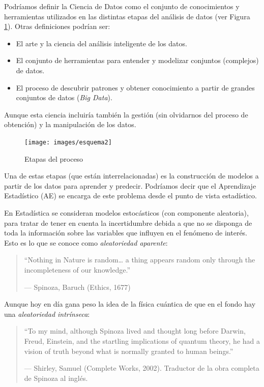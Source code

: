 \documentclass[
  spanish,
]{book}
\theoremstyle{break}
\theoremstyle{definition}
\theoremstyle{definition}
\theoremstyle{definition}
\theoremstyle{definition}
\theoremstyle{remark}
\begin{document}
Podríamos definir la Ciencia de Datos como el conjunto de conocimientos y herramientas utilizados en las distintas etapas del análisis de datos (ver Figura \ref{fig:esquema}). Otras definiciones podrían ser:

\begin{itemize}
\item
  El arte y la ciencia del análisis inteligente de los datos.
\item
  El conjunto de herramientas para entender y modelizar conjuntos
  (complejos) de datos.
\item
  El proceso de descubrir patrones y obtener conocimiento a partir de
  grandes conjuntos de datos (\emph{Big Data}).
\end{itemize}

Aunque esta ciencia incluiría también la gestión (sin olvidarnos del proceso de obtención) y la manipulación de los datos.

\begin{figure}[!htb]

{\centering \texttt{[image: images/esquema2]} 

}

\caption{Etapas del proceso}\label{fig:esquema}
\end{figure}

Una de estas etapas (que están interrelacionadas) es la construcción de modelos a partir de los datos para aprender y predecir. Podríamos decir que el Aprendizaje Estadístico (AE) se encarga de este problema desde el punto de vista estadístico.

En Estadística se consideran modelos estocásticos (con componente aleatoria), para tratar de tener en cuenta la incertidumbre debida a que no se disponga de toda la información sobre las variables que influyen en el fenómeno de interés.
Esto es lo que se conoce como \emph{aleatoriedad aparente}:

\begin{quote}
``Nothing in Nature is random\ldots{} a thing appears random only through the incompleteness of our knowledge.''

--- Spinoza, Baruch (Ethics, 1677)
\end{quote}

Aunque hoy en día gana peso la idea de la física cuántica de que en el fondo hay una \emph{aleatoriedad intrínseca}:

\begin{quote}
``To my mind, although Spinoza lived and thought long before Darwin, Freud, Einstein, and the startling implications of quantum theory, he had a vision of truth beyond what is normally granted to human beings.''

--- Shirley, Samuel (Complete Works, 2002). Traductor de la obra completa de Spinoza al inglés.
\end{quote}
\end{document}
